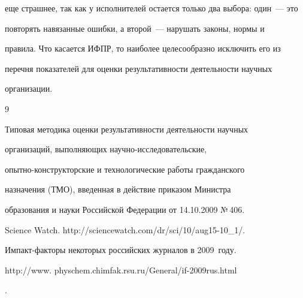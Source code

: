 еще страшнее, так как у исполнителей остается только два выбора: один~--- это 


повторять навязанные ошибки, а второй~--- нарушать законы, нормы и 


правила. Что касается ИФПР, то наиболее целесообразно исключить его из 


перечня показателей для оценки результативности деятельности научных 


организации.





{\small\frenchspacing


{%




\begin{thebibliography}{9}










Типовая методика оценки результативности деятельности научных 


организаций, выполняющих научно-исследовательские, 


опытно-конструкторские и технологические работы гражданского 


назначения (ТМО), введенная в действие приказом Министра 


образования и науки Российской Федерации от 14.10.2009 №\,406.







Science Watch. {\sf http://sciencewatch.com/dr/sci/10/aug15-10\_1/}.





       \label{end\stat}







Импакт-факторы некоторых российских журналов в 2009~году. {\sf 


http://www. physchem.chimfak.rsu.ru/General/if-2009rus.html}.


\end{thebibliography}


}


}         


     





     


